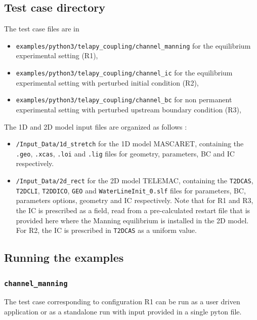 \documentclass[Coupling]{../../data/TelemacDoc} %
\begin{document}
\subsection{Test case directory}

The test case files are in 
\begin{itemize}
\item \texttt{examples/python3/telapy\_coupling/channel\_manning} for
  the equilibrium experimental setting (R1),  
\item \texttt{examples/python3/telapy\_coupling/channel\_ic} for the
  equilibrium experimental setting with perturbed initial condition
  (R2),  
\item \texttt{examples/python3/telapy\_coupling/channel\_bc} for non
  permanent experimental setting with perturbed upstream boundary
  condition (R3),  
\end{itemize}

The 1D and 2D model input files are organized as follows : 
\begin{itemize}
\item \texttt{/Input\_Data/1d\_stretch} for the 1D model MASCARET,
  containing the \texttt{.geo}, \texttt{.xcas}, \texttt{.loi} and
  \texttt{.lig} files for geometry, parameters, BC and IC
  respectively. 
\item \texttt{/Input\_Data/2d\_rect} for the 2D model TELEMAC,
  containing the \texttt{T2DCAS}, \texttt{T2DCLI}, \texttt{T2DDICO},
  \texttt{GEO} and \texttt{WaterLineInit\_0.slf} files for parameters,
  BC, parameters options, geometry and IC respectively. Note that for
  R1 and R3, the IC is prescribed as a field, read from a
  pre-calculated restart file that is provided here where the Manning
  equilibrium is installed in the 2D model. For R2, the IC is
  prescribed in \texttt{T2DCAS} as a uniform value. 
\end{itemize}

\subsection{Running the examples}

\subsubsection{\texttt{channel\_manning}}\label{exe:channel_manning}
The test case corresponding to configuration R1 can be run as a user
driven application or as a standalone run with input provided in a
single pyton file.\\
\end{document}
